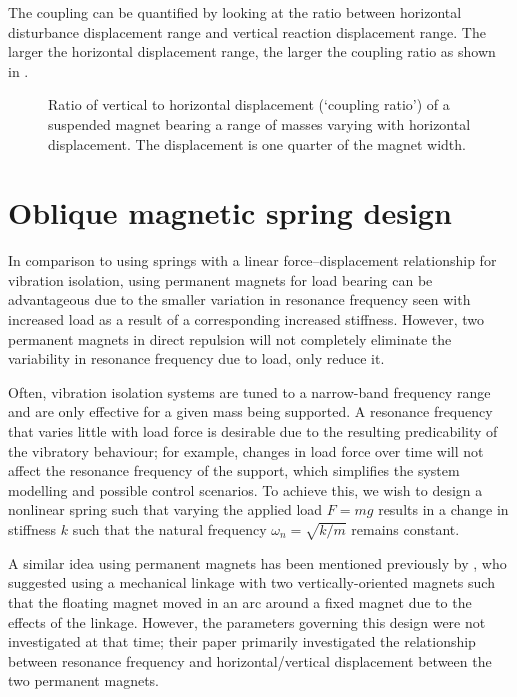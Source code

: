 \documentclass[11pt,a4paper]{memoir}
\begin{document}
The coupling can be quantified by looking at the ratio between horizontal
disturbance displacement range and vertical reaction displacement range. The
larger the horizontal displacement range, the larger the coupling ratio as
shown in .

\begin{figure}
  \caption{Ratio of vertical to horizontal displacement (`coupling ratio') of
  a suspended magnet bearing a range of masses varying with horizontal
  displacement. The displacement is one quarter of the magnet width.}
\end{figure}



\section{Oblique magnetic spring design}

In comparison to using springs with a linear force--displacement relationship for vibration isolation, using permanent magnets for load bearing can be advantageous due to the smaller variation in resonance frequency seen with increased load as a result of a corresponding increased stiffness.
However, two permanent magnets in direct repulsion will not completely eliminate the variability in resonance frequency due to load, only reduce it.

Often, vibration isolation systems are tuned to a narrow-band frequency range and are only effective for a given mass being supported.
A resonance frequency that varies little with load force is desirable due to the resulting predicability of the vibratory behaviour; for example, changes in load force over time will not affect the resonance frequency of the support, which simplifies the system modelling and possible control scenarios.
To achieve this, we wish to design a nonlinear spring such that varying the applied load $F=mg$ results in a change in stiffness $k$ such that the natural frequency $\omega_n=\sqrt{k/m}$ remains constant.

A similar idea using permanent magnets has been mentioned previously by \textcite{todaka2001-ietm}, who suggested using a mechanical linkage with two vertically-oriented magnets such that the floating magnet moved in an arc around a fixed magnet due to the effects of the linkage.
However, the parameters governing this design were not investigated at that time; their paper primarily investigated the relationship between resonance frequency and horizontal/vertical displacement between the two permanent magnets.
\end{document}
